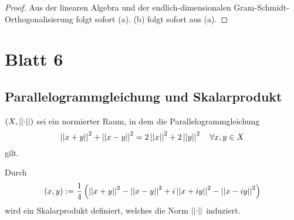 \documentclass[FunkAnaSkript.tex]{subfiles}
\begin{document}
	\begin{proof}
		Aus der linearen Algebra und der endlich-dimensionalen Gram-Schmidt-Orthogonalisierung folgt sofort (a). (b) folgt sofort aus (a).	
	\end{proof}
	
	
	
\newpage
\section{Blatt 6}

\subsection{ Parallelogrammgleichung und Skalarprodukt}
\label{B6.1}
	$(X,\norm{\cdot})$ sei ein normierter Raum, in dem die Parallelogrammgleichung 
	$$\norm{x+y}^2 + \norm{x-y}^2 = 2\norm{x}^2 + 2\norm{y}^2\quad \forall x,y \in X$$	
	gilt. 
	\begin{beh}	
	Durch 
	$$(x,y) := \frac{1}{4} \left( \norm{x+y}^2 - \norm{x-y}^2 + i\norm{x+iy}^2 - \norm{x-iy}^2 \right)$$
	wird ein Skalarprodukt definiert, welches die Norm $\norm{\cdot}$ induziert.
	\end{beh}
\end{document}
